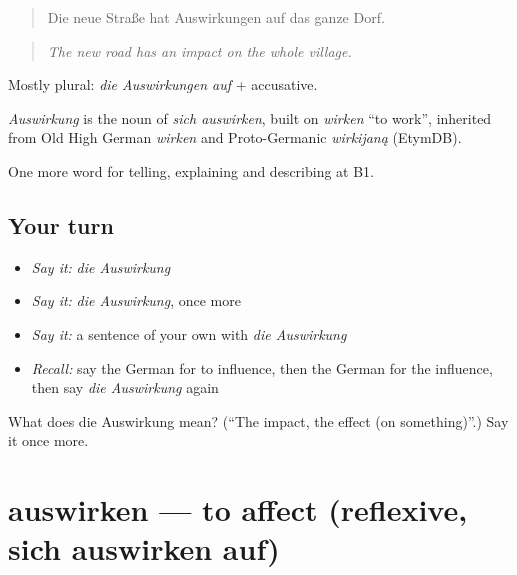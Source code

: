 \begin{quote}
Die neue Straße hat Auswirkungen auf das ganze Dorf.
\end{quote}

\begin{quote}
\emph{The new road has an impact on the whole village.}
\end{quote}

Mostly plural: \emph{die Auswirkungen auf} + accusative.

\begin{cousinweb}
\emph{Auswirkung} is the noun of \emph{sich auswirken}, built on \emph{wirken} \textquotedblleft{}to work\textquotedblright{}, inherited from Old High German \emph{wirken} and Proto-Germanic \emph{wirkijaną} (EtymDB).
\end{cousinweb}

\begin{grammarlens}[title={What you've built}]
One more word for telling, explaining and describing at B1.
\end{grammarlens}

\subsection*{Your turn}
\begin{itemize}
\raggedright
  \item \emph{Say it:} \emph{die Auswirkung}
  \item \emph{Say it:} \emph{die Auswirkung}, once more
  \item \emph{Say it:} a sentence of your own with \emph{die Auswirkung}
  \item \emph{Recall:} say the German for to influence, then the German for the influence, then say \emph{die Auswirkung} again
\end{itemize}

\begin{tcolorbox}[breakable,colback=teal!4,colframe=teal!35!black,title={Before you move on}]
What does die Auswirkung mean? (\textquotedblleft{}The impact, the effect (on something)\textquotedblright{}.) Say it once more.
\end{tcolorbox}
\section[auswirken]{auswirken — to affect (reflexive, sich auswirken auf)}

\label{lesson:GE-C344-auswirken}



